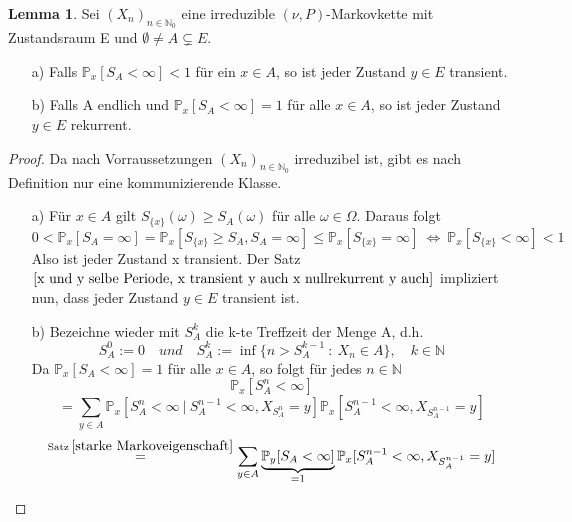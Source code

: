 \documentclass[a4paper,12pt]{scrartcl}
\theoremstyle{definition}
\newtheorem{lemi}{Lemma}[section]
\begin{document}
\begin{lemi}
\label{Px[SA < unendlich] < 1, so y transient}
Sei $(X_{n})_{n \in \mathbb{N}_{0}}$ eine irreduzible $(\nu,P)$-Markovkette mit Zustandsraum E und $\emptyset \neq A \subsetneq E$.
\begin{itemize}
\item[a)] Falls $\mathbb{P}_{x}[S_{A} < \infty]<1$ für ein $x \in A$, so ist jeder Zustand $y \in E$ transient.
\item[b)] Falls A endlich und $\mathbb{P}_{x}[S_{A}<\infty]=1$ für alle $x \in A$, so ist jeder Zustand $y \in E$ rekurrent.  
\end{itemize}
\end{lemi}
\begin{proof}
Da nach Vorraussetzungen $(X_{n})_{n \in \mathbb{N}_{0}}$ irreduzibel ist, gibt es nach Definition nur eine kommunizierende Klasse.
\begin{itemize}
\item[a)] Für $x \in A$ gilt $S_{\lbrace x \rbrace}(\omega) \geq S_{A}(\omega)$ für alle $\omega \in \Omega$. Daraus folgt
\begin{equation*}
0<\mathbb{P}_{x}[S_{A}=\infty] = \mathbb{P}_{x}[S_{\lbrace x \rbrace} \geq S_{A}, S_{A} = \infty] \leq \mathbb{P}_{x}[S_{\lbrace x \rbrace} = \infty] \: \Leftrightarrow \: \mathbb{P}_{x}[S_{\lbrace x \rbrace} < \infty] < 1
\end{equation*}
Also ist jeder Zustand x transient. Der Satz $\ref{x und y selbe Periode, x transient y auch x nullrekurrent y auch}$ impliziert nun, dass jeder Zustand $y \in E$ transient ist. 
\item[b)] Bezeichne wieder mit $S_{A}^{k}$ die k-te Treffzeit der Menge A, d.h.
\begin{equation*}
S_{A}^{0} := 0 \quad und \quad S_{A}^{k} := \inf \lbrace n> S_{A}^{k-1} \: : \: X_{n} \in A \rbrace, \quad k \in \mathbb{N}
\end{equation*}
Da $\mathbb{P}_{x}[S_{A} < \infty] = 1$ für alle $x \in A$, so folgt für jedes $n \in \mathbb{N}$
\begin{equation*}
\mathbb{P}_{x} [S_{A}^{n} < \infty] 
\end{equation*}
\begin{equation*}
= \sum_{y \in A} \mathbb{P}_{x}[S_{A}^{n} < \infty \: | \: S_{A}^{n-1} < \infty, X_{S_{A}^{n}}=y]\mathbb{P}_{x} [S_{A}^{n-1} < \infty, X_{S_{A}^{n-1}} = y] 
\end{equation*}
\begin{equation*}
\stackrel{\mathrm{Satz} \: \ref{starke Markoveigenschaft}}{=} \sum_{y \in A} \underbrace{\mathbb{P}_{y}[S_{A} < \infty]}_{= 1} \mathbb{P}_{x} [S_{A}^{n-1} < \infty, X_{S_{A}^{n-1}} = y]

\end{equation*}
\end{itemize}
\end{proof}
\end{document}
